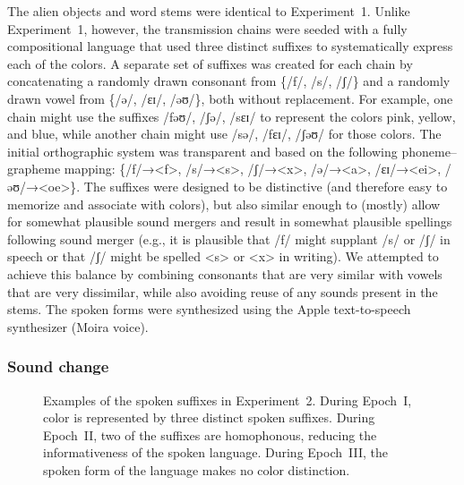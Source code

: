 \documentclass[doc,biblatex]{apa7}
\begin{document}
The alien objects and word stems were identical to Experiment~1. Unlike Experiment~1, however, the transmission chains were seeded with a fully compositional language that used three distinct suffixes to systematically express each of the colors. A separate set of suffixes was created for each chain by concatenating a randomly drawn consonant from \{/f/, /s/, /ʃ/\} and a randomly drawn vowel from \{/ə/, /ɛɪ/, /əʊ/\}, both without replacement. For example, one chain might use the suffixes /fəʊ/, /ʃə/, /sɛɪ/ to represent the colors pink, yellow, and blue, while another chain might use /sə/, /fɛɪ/, /ʃəʊ/ for those colors. The initial orthographic system was transparent and based on the following phoneme–grapheme mapping: \{/f/→<f>, /s/→<s>, /ʃ/→<x>, /ə/→<a>, /ɛɪ/→<ei>, /əʊ/→<oe>\}. The suffixes were designed to be distinctive (and therefore easy to memorize and associate with colors), but also similar enough to (mostly) allow for somewhat plausible sound mergers and result in somewhat plausible spellings following sound merger (e.g., it is plausible that /f/ might supplant /s/ or /ʃ/ in speech or that /ʃ/ might be spelled <s> or <x> in writing). We attempted to achieve this balance by combining consonants that are very similar with vowels that are very dissimilar, while also avoiding reuse of any sounds present in the stems. The spoken forms were synthesized using the Apple text-to-speech synthesizer (Moira voice).

\subsubsection{Sound change}

	\begin{figure}
	\vspace*{2pt}
	\caption{Examples of the spoken suffixes in Experiment~2. During Epoch~I, color is represented by three distinct spoken suffixes. During Epoch~II, two of the suffixes are homophonous, reducing the informativeness of the spoken language. During Epoch~III, the spoken form of the language makes no color distinction.}
	\label{fig08}
	\end{figure}
\end{document}
